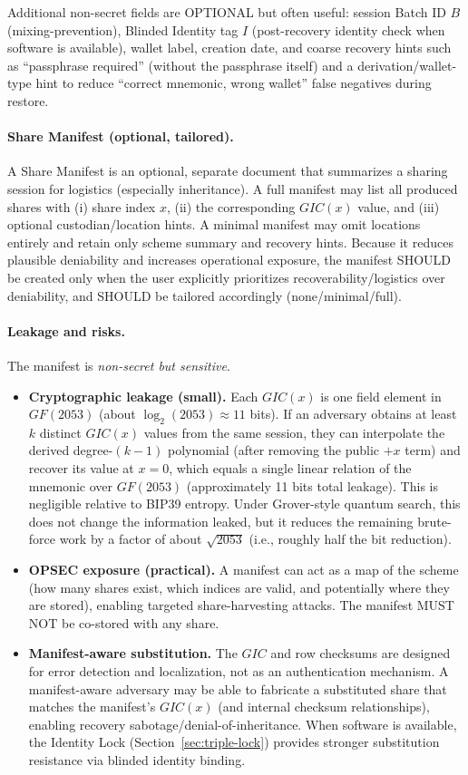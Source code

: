 \documentclass[11pt]{article}
\begin{document}
Additional non-secret fields are OPTIONAL but often useful: session Batch ID $B$ (mixing-prevention), Blinded Identity tag $I$ (post-recovery identity check when software is available), wallet label, creation date, and coarse recovery hints such as ``passphrase required'' (without the passphrase itself) and a derivation/wallet-type hint to reduce ``correct mnemonic, wrong wallet'' false negatives during restore.

\paragraph{Share Manifest (optional, tailored).} A Share Manifest is an optional, separate document that summarizes a sharing session for logistics (especially inheritance). A full manifest may list all produced shares with (i) share index $x$, (ii) the corresponding $GIC(x)$ value, and (iii) optional custodian/location hints. A minimal manifest may omit locations entirely and retain only scheme summary and recovery hints. Because it reduces plausible deniability and increases operational exposure, the manifest SHOULD be created only when the user explicitly prioritizes recoverability/logistics over deniability, and SHOULD be tailored accordingly (none/minimal/full).

\paragraph{Leakage and risks.} The manifest is \textit{non-secret but sensitive}.
\begin{itemize}[noitemsep]
    \item \textbf{Cryptographic leakage (small).} Each $GIC(x)$ is one field element in $GF(2053)$ (about $\log_2(2053)\approx 11$ bits). If an adversary obtains at least $k$ distinct $GIC(x)$ values from the same session, they can interpolate the derived degree-$(k-1)$ polynomial (after removing the public $+x$ term) and recover its value at $x=0$, which equals a single linear relation of the mnemonic over $GF(2053)$ (approximately 11 bits total leakage). This is negligible relative to BIP39 entropy.
    Under Grover-style quantum search, this does not change the information leaked, but it reduces the remaining brute-force work by a factor of about $\sqrt{2053}$ (i.e., roughly half the bit reduction).
    \item \textbf{OPSEC exposure (practical).} A manifest can act as a map of the scheme (how many shares exist, which indices are valid, and potentially where they are stored), enabling targeted share-harvesting attacks. The manifest MUST NOT be co-stored with any share.
    \item \textbf{Manifest-aware substitution.} The $GIC$ and row checksums are designed for error detection and localization, not as an authentication mechanism. A manifest-aware adversary may be able to fabricate a substituted share that matches the manifest's $GIC(x)$ (and internal checksum relationships), enabling recovery sabotage/denial-of-inheritance. When software is available, the Identity Lock (Section~\ref{sec:triple-lock}) provides stronger substitution resistance via blinded identity binding.
\end{itemize}
\end{document}
